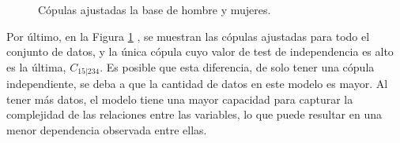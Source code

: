 \begin{figure}[H]
 \centering
    \caption{Cópulas ajustadas la base de hombre y mujeres.}
    \label{fig:copulasTestTotal}
\end{figure}

Por último, en la Figura \ref{fig:copulasTestTotal}
, se muestran las cópulas ajustadas para todo el conjunto de datos, y la única cópula cuyo valor de test de independencia es alto es la última, $C_{15|234}$. Es posible que esta diferencia, de solo tener una cópula independiente, se deba a que la cantidad de datos en este modelo es mayor. Al tener más datos, el modelo tiene una mayor capacidad para capturar la complejidad de las relaciones entre las variables, lo que puede resultar en una menor dependencia observada entre ellas.


